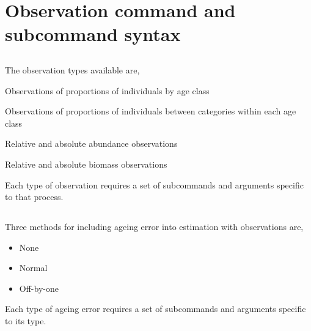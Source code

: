 \section{Observation command and subcommand syntax\label{sec:observation-syntax}}


\subsection{}

The observation types available are,

\begin{description}
  \item Observations of proportions of individuals by age class
  \item Observations of proportions of individuals between categories within each age class
  \item Relative and absolute abundance observations
  \item Relative and absolute biomass observations
\end{description}

Each type of observation requires a set of subcommands and arguments specific to that process.



\subsection{}


\subsection{}

Three methods for including ageing error into estimation with observations are,

\begin{itemize}
	\item None
	\item Normal
	\item Off-by-one
\end{itemize}

Each type of ageing error requires a set of subcommands and arguments specific to its type.



